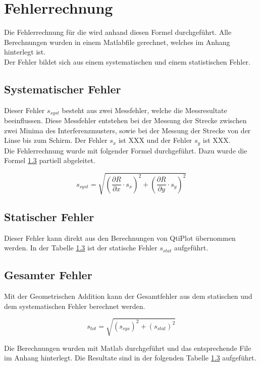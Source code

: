 \section{Fehlerrechnung}

Die Fehlerrechnung für die wird anhand diesen Formel durchgeführt. Alle Berechnungen wurden in einem Matlabfile gerechnet, welches im Anhang hinterlegt ist.\\
Der Fehler bildet sich aus einem systematischen und einem statistischen Fehler.
 
\subsection{Systematischer Fehler}
Dieser Fehler $ s_{syst} $ besteht aus zwei Messfehler, welche die Messresultate beeinflussen. Diese Messfehler entstehen bei der Messung der Strecke zwischen zwei Minima des Interferenzmusters, sowie bei der Messung der Strecke von der Linse bis zum Schirm. Der Fehler $ s_{x} $ ist XXX und der Fehler $ s_{y} $ ist XXX. \\
Die Fehlerrechnung wurde mit folgender Formel durchgeführt. Dazu wurde die Formel \ref{} partiell abgeleitet.

\begin{equation}
s_{syst} = \sqrt{\left(\frac{\partial R}{\partial x}\cdot s_{x}\right)^2+\left(\frac{\partial R}{\partial y}\cdot s_{y}\right)^2}
\label{eq:syst Fehler}
\end{equation}

\subsection{Statischer Fehler}
Dieser Fehler kann direkt aus den Berechnungen von QtiPlot übernommen werden. In der Tabelle \ref{} ist der statische Fehler $ s_{stat} $ aufgeführt.

\subsection{Gesamter Fehler}
Mit der Geometrischen Addition kann der Gesamtfehler aus dem statischen und dem systematischen Fehler berechnet werden.

\begin{equation}
s_{tot} = \sqrt{(s_{sys})^2+(s_{stat})^2}
\label{eq:gesamter Fehler}
\end{equation}

Die Berechnungen wurden mit Matlab durchgeführt und das entsprechende File im Anhang hinterlegt. Die Resultate sind in der folgenden Tabelle \ref{} aufgeführt.